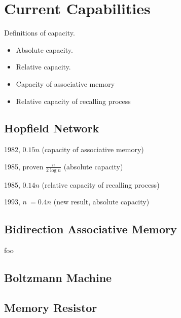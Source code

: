 \documentclass[12pt, a4paper]{article}
\begin{document}

\section{Current Capabilities}

Definitions of capacity.

\begin{itemize}
\item Absolute capacity.
\item Relative capacity.
\item Capacity of associative memory
\item Relative capacity of recalling process
\end{itemize}

\subsection{Hopfield Network}


1982, $0.15n$ (capacity of associative memory)


1985, proven $ \frac{n}{2\log{n}} $ (absolute capacity)

1985, $0.14n$ (relative capacity of recalling process)

1993, $ n ~= 0.4n $ (new result, absolute capacity)

\subsection{Bidirection Associative Memory}


foo

\subsection{Boltzmann Machine}



\subsection{Memory Resistor}
\end{document}
